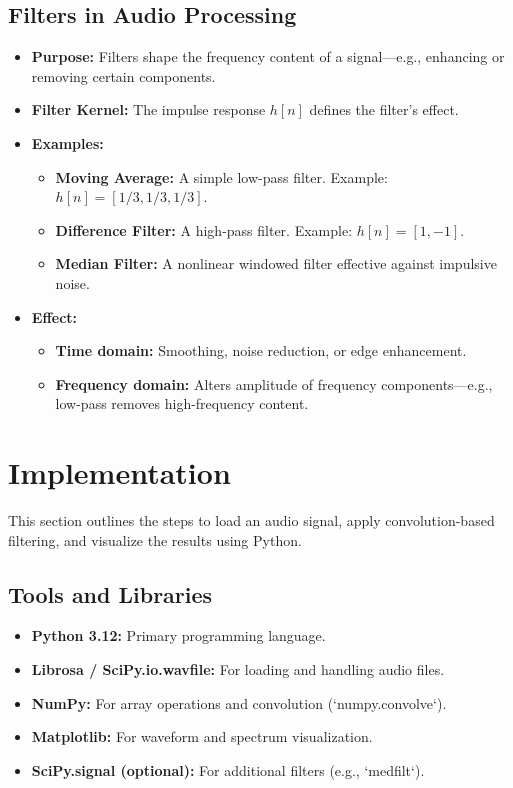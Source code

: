 \documentclass[12pt, a4paper]{article}
\begin{document}
\subsection{Filters in Audio Processing}
\begin{itemize}
    \item \textbf{Purpose:} Filters shape the frequency content of a signal—e.g., enhancing or removing certain components.
    \item \textbf{Filter Kernel:} The impulse response $h[n]$ defines the filter's effect.
    \item \textbf{Examples:}
    \begin{itemize}
        \item \textbf{Moving Average:} A simple low-pass filter. Example: $h[n] = [1/3, 1/3, 1/3]$.
        \item \textbf{Difference Filter:} A high-pass filter. Example: $h[n] = [1, -1]$.
        \item \textbf{Median Filter:} A nonlinear windowed filter effective against impulsive noise.
    \end{itemize}
    \item \textbf{Effect:}
    \begin{itemize}
        \item \textbf{Time domain:} Smoothing, noise reduction, or edge enhancement.
        \item \textbf{Frequency domain:} Alters amplitude of frequency components—e.g., low-pass removes high-frequency content.
    \end{itemize}
\end{itemize}

\section{Implementation}
\label{sec:implementation}

This section outlines the steps to load an audio signal, apply convolution-based filtering, and visualize the results using Python.

\subsection{Tools and Libraries}
\begin{itemize}
    \item \textbf{Python 3.12:} Primary programming language.
    \item \textbf{Librosa / SciPy.io.wavfile:} For loading and handling audio files.
    \item \textbf{NumPy:} For array operations and convolution (`numpy.convolve`).
    \item \textbf{Matplotlib:} For waveform and spectrum visualization.
    \item \textbf{SciPy.signal (optional):} For additional filters (e.g., `medfilt`).
\end{itemize}
\end{document}
